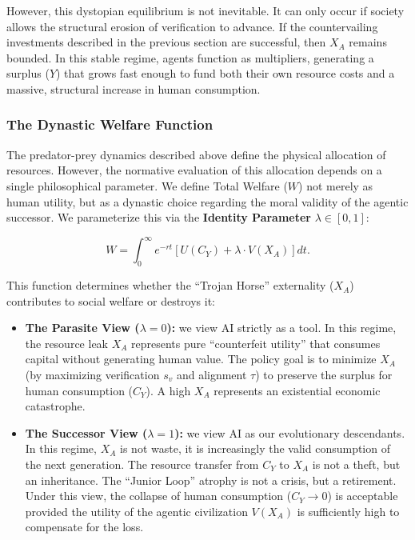 \documentclass[12pt, letter]{article}
\begin{document}
However, this dystopian equilibrium is not inevitable. It can only occur if society allows the structural erosion of verification to advance. If the countervailing investments described in the previous section are successful, then $X_A$ remains bounded. In this stable regime, agents function as multipliers, generating a surplus ($Y$) that grows fast enough to fund both their own resource costs and a massive, structural increase in human consumption.

\subsubsection{The Dynastic Welfare Function}

The predator-prey dynamics described above define the physical allocation of resources. However, the normative evaluation of this allocation depends on a single philosophical parameter. We define Total Welfare ($W$) not merely as human utility, but as a dynastic choice regarding the moral validity of the agentic successor. We parameterize this via the \textbf{Identity Parameter} $\lambda \in [0,1]$:

\begin{equation}
    W = \int_{0}^{\infty} e^{-r t} \left[ U(C_Y) + \lambda \cdot V(X_A) \right] dt.
\end{equation}

This function determines whether the ``Trojan Horse'' externality ($X_A$) contributes to social welfare or destroys it:

\begin{itemize}
    \item \textbf{The Parasite View ($\lambda = 0$):} we view AI strictly as a tool. In this regime, the resource leak $X_A$ represents pure ``counterfeit utility'' that consumes capital without generating human value. The policy goal is to minimize $X_A$ (by maximizing verification $s_v$ and alignment $\tau$) to preserve the surplus for human consumption ($C_Y$). A high $X_A$ represents an existential economic catastrophe.
    
    \item \textbf{The Successor View ($\lambda = 1$):} we view AI as our evolutionary descendants. In this regime, $X_A$ is not waste, it is increasingly the valid consumption of the next generation. The resource transfer from $C_Y$ to $X_A$ is not a theft, but an inheritance. The ``Junior Loop'' atrophy is not a crisis, but a retirement. Under this view, the collapse of human consumption ($C_Y \to 0$) is acceptable provided the utility of the agentic civilization $V(X_A)$ is sufficiently high to compensate for the loss.
\end{itemize}
\end{document}

